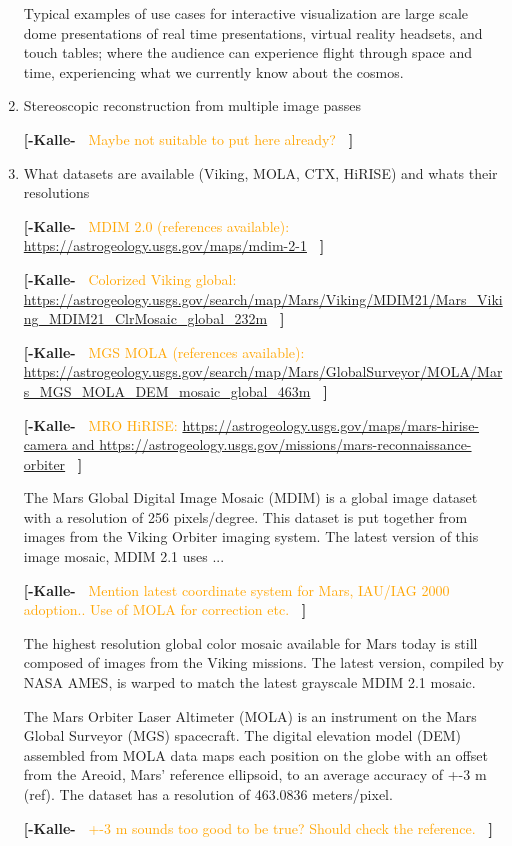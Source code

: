 \documentclass[journal]{vgtc}                %
\newcommand{\kallecomment}[1]{\textbf{[-Kalle-~}
    \textcolor{orange}{#1}
    \textbf{~]}}
\begin{document}
\begin{enumerate}
Typical examples of use cases for interactive visualization are large scale dome presentations of real time presentations, virtual reality headsets, and touch tables; where the audience can experience flight through space and time, experiencing what we currently know about the cosmos.

\item Stereoscopic reconstruction from multiple image passes

\kallecomment{Maybe not suitable to put here already?}

\item What datasets are available (Viking, MOLA, CTX, HiRISE) and whats their resolutions

\kallecomment{MDIM 2.0 (references available): \url{https://astrogeology.usgs.gov/maps/mdim-2-1}}

\kallecomment{Colorized Viking global: \url{https://astrogeology.usgs.gov/search/map/Mars/Viking/MDIM21/Mars_Viking_MDIM21_ClrMosaic_global_232m}}

\kallecomment{MGS MOLA (references available): \url{https://astrogeology.usgs.gov/search/map/Mars/GlobalSurveyor/MOLA/Mars_MGS_MOLA_DEM_mosaic_global_463m}}

\kallecomment{MRO HiRISE: \url{https://astrogeology.usgs.gov/maps/mars-hirise-camera and https://astrogeology.usgs.gov/missions/mars-reconnaissance-orbiter}}

The Mars Global Digital Image Mosaic (MDIM) is a global image dataset with a resolution of 256 pixels/degree.
This dataset is put together from images from the Viking Orbiter imaging system. The latest version of this image mosaic, MDIM 2.1 uses ...

\kallecomment{Mention latest coordinate system for Mars, IAU/IAG 2000 adoption.. Use of MOLA for correction etc.}

The highest resolution global color mosaic available for Mars today is still composed of images from the Viking missions.
The latest version, compiled by NASA AMES, is warped to match the latest grayscale MDIM 2.1 mosaic. 

The Mars Orbiter Laser Altimeter (MOLA) is an instrument on the Mars Global Surveyor (MGS) spacecraft.
The digital elevation model (DEM) assembled from MOLA data maps each position on the globe with an offset from the Areoid, Mars' reference ellipsoid, to an average accuracy of +-3 m (ref). The dataset has a resolution of 463.0836 meters/pixel.

\kallecomment{+-3 m sounds too good to be true? Should check the reference.}


\end{enumerate}
\end{document}
